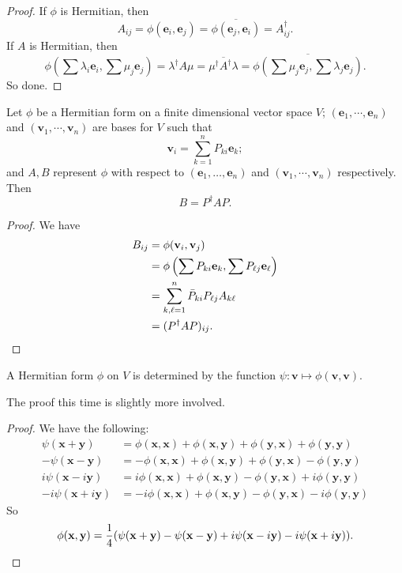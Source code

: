 \documentclass[a4paper]{article}
\begin{document}
\begin{proof}
  If $\phi$ is Hermitian, then
  \[
    A_{ij} = \phi(\mathbf{e}_i, \mathbf{e}_j) = \overline{\phi(\mathbf{e}_j, \mathbf{e}_i)} = A^{\dagger}_{ij}.
  \]
  If $A$ is Hermitian, then
  \[
    \phi\left(\sum \lambda_i \mathbf{e}_i, \sum \mu_j \mathbf{e}_j\right) = \lambda^\dagger A \mu = \overline{\mu^\dagger A^\dagger \lambda} = \overline{\phi\left(\sum \mu_j \mathbf{e}_j, \sum \lambda_j \mathbf{e}_j\right)}.
  \]
  So done.
\end{proof}

\begin{prop}
  Let $\phi$ be a Hermitian form on a finite dimensional vector space $V$; $(\mathbf{e}_1, \cdots, \mathbf{e}_n)$ and $(\mathbf{v}_1, \cdots, \mathbf{v}_n)$ are bases for $V$ such that
  \[
    \mathbf{v}_i = \sum_{k = 1}^n P_{ki} \mathbf{e}_k;
  \]
  and $A, B$ represent $\phi$ with respect to $(\mathbf{e}_1, \ldots, \mathbf{e}_n)$ and $(\mathbf{v}_1, \cdots, \mathbf{v}_n)$ respectively. Then
  \[
    B = P^\dagger AP.
  \]
\end{prop}

\begin{proof}
  We have
  \begin{align*}
    B_{ij} &= \phi(\mathbf{v}_i, \mathbf{v}_j) \\
    &= \phi\left(\sum P_{ki} \mathbf{e}_k, \sum P_{\ell j} \mathbf{e}_\ell\right)\\
    &= \sum_{k, \ell = 1}^n \bar{P}_{ki} P_{\ell j} A_{k\ell}\\
    &= (P^\dagger AP)_{ij}.\qedhere
  \end{align*}
\end{proof}

\begin{lemma}
  A Hermitian form $\phi$ on $V$ is determined by the function $\psi: \mathbf{v} \mapsto \phi(\mathbf{v}, \mathbf{v})$.
\end{lemma}

The proof this time is slightly more involved.
\begin{proof}
  We have the following:
  \begin{align*}
    \psi(\mathbf{x} + \mathbf{y}) &= \phi(\mathbf{x}, \mathbf{x}) + \phi(\mathbf{x}, \mathbf{y}) + \phi(\mathbf{y}, \mathbf{x}) + \phi(\mathbf{y}, \mathbf{y})\\
   -\psi(\mathbf{x} - \mathbf{y}) &= -\phi(\mathbf{x}, \mathbf{x}) + \phi(\mathbf{x}, \mathbf{y}) + \phi(\mathbf{y}, \mathbf{x}) - \phi(\mathbf{y}, \mathbf{y})\\
   i\psi(\mathbf{x} -i\mathbf{y}) &= i\phi(\mathbf{x}, \mathbf{x}) + \phi(\mathbf{x}, \mathbf{y}) - \phi(\mathbf{y}, \mathbf{x}) +i\phi(\mathbf{y}, \mathbf{y})\\
  -i\psi(\mathbf{x} +i\mathbf{y}) &=-i\phi(\mathbf{x}, \mathbf{x}) + \phi(\mathbf{x}, \mathbf{y}) - \phi(\mathbf{y}, \mathbf{x}) -i\phi(\mathbf{y}, \mathbf{y})
  \end{align*}
  So
  \[
    \phi(\mathbf{x}, \mathbf{y}) = \frac{1}{4}(\psi(\mathbf{x} + \mathbf{y}) - \psi(\mathbf{x} - \mathbf{y}) + i\psi(\mathbf{x} - i\mathbf{y}) - i \psi(\mathbf{x} + i\mathbf{y})).\qedhere
  \]
\end{proof}
\end{document}
